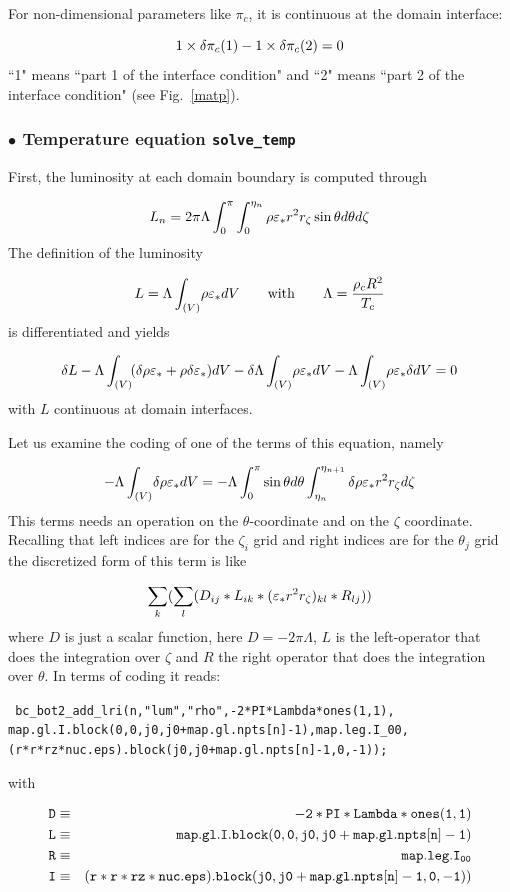 For non-dimensional parameters like $\pi_c$, it is continuous at the domain
interface:

\[ 1\times\delta\pi_c({\rm 1}) -1\times\delta\pi_c({\rm 2}) = 0\]
``1" means ``part 1 of the interface condition" and ``2" means ``part 2
of the interface condition" (see Fig.~\ref{matp}).


\subsubsection{$\bullet$ \bf Temperature equation {\tt solve\_temp}}

First, the luminosity at each domain boundary is computed through

\[ L_n = 2\pi\Lambda\int_0^\pi\int_0^{\eta_n} \rho\varepsilon_* r^2r_\zeta\sin\theta
d\theta d\zeta\]
The definition of the luminosity 

\[ L=\Lambda\int_{(V)}\! \rho\varepsilon_* dV {\qquad {\rm with}\qquad} \Lambda = \frac{\rho_cR^2}{T_c}\]
is differentiated and yields

\[ \delta L - \Lambda\int_{(V)}\! (\delta\rho\varepsilon_* +\rho\delta\varepsilon_*)dV -
\delta\Lambda\int_{(V)}\! \rho\varepsilon_* dV - \Lambda\int_{(V)}\! \rho\varepsilon_* \delta dV
= 0\]
with $L$ continuous at domain interfaces.

Let us examine the coding of one of the terms of this equation, namely

\[ - \Lambda\int_{(V)}\!\delta\rho\varepsilon_* dV = -\Lambda\int_0^\pi\sin\theta d\theta
\int_{\eta_n}^{\eta_{n+1}} \delta\rho\varepsilon_*r^2r_\zeta d\zeta\]
This terms needs an operation on the $\theta$-coordinate and on the
$\zeta$ coordinate. Recalling that left indices are for the $\zeta_i$
grid and right indices are for the $\theta_j$ grid the discretized form of
this  term is like

\[\sum_k ( \sum_l  ( D_{ij} * L_{ik} * (\varepsilon_*r^2r_\zeta)_{kl} * R_{lj}  ))  \]
where $D$ is just a scalar function, here $D=-2\pi\Lambda$, $L$ is the
left-operator that does the integration over $\zeta$ and $R$ the right
operator that does the integration over $\theta$. In terms of coding it
reads:

\begin{center}
{\tt
bc\_bot2\_add\_lri(n,"lum","rho",-2*PI*Lambda*ones(1,1),\\
map.gl.I.block(0,0,j0,j0+map.gl.npts[n]-1),map.leg.I\_00,\\
(r*r*rz*nuc.eps).block(j0,j0+map.gl.npts[n]-1,0,-1)); }
\end{center}

with

\begin{eqnarray}
\tt D &\equiv&\tt -2*PI*Lambda*ones(1,1)\nonumber\\
\tt L &\equiv&\tt map.gl.I.block(0,0,j0,j0+map.gl.npts[n]-1)\nonumber\\
\tt R &\equiv&\tt map.leg.I_{00}\nonumber\\
\tt I &\equiv&\tt
(r*r*rz*nuc.eps).block(j0,j0+map.gl.npts[n]-1,0,-1))\nonumber 
\end{eqnarray}



